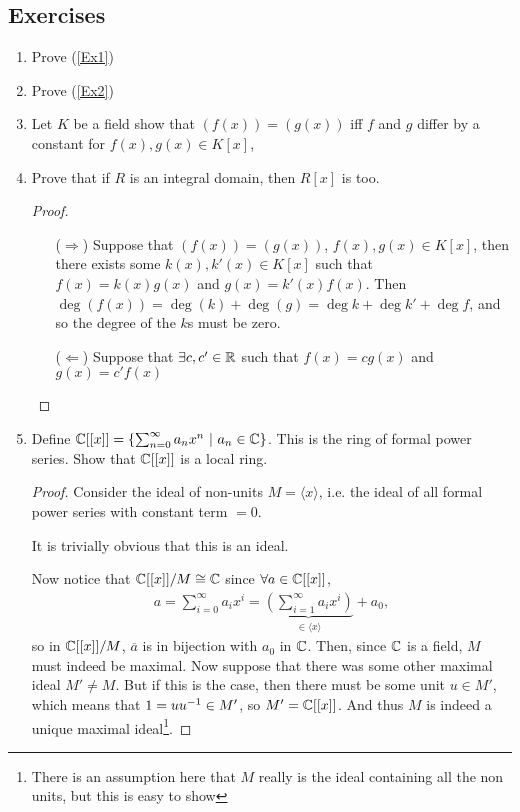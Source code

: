 \documentclass[12pt, twosided]{article}
\begin{document}
\subsection{Exercises}
\begin{enumerate}
\item Prove (\ref{Ex1})
\item Prove (\ref{Ex2})
\item Let \(K\) be a field show that \((f(x)) = (g(x))\) iff \(f\) and \(g\) differ by a constant for \(f(x), g(x) \in K[x]\), 
\item Prove that if \(R\) is an integral domain, then \(R[x]\) is too.
  \begin{proof}
    \begin{enumerate}
    \item [(\(\Rightarrow\))]Suppose that \((f(x)) = (g(x))\), \(f(x), g(x) \in K[x]\), then there exists some \(k(x), k\prime(x) \in K[x]\) such that \(f(x) = k(x)g(x)\) and \(g(x) = k\prime(x)f(x)\). Then \(\deg(f(x)) = \deg(k) + \deg(g) = \deg k + \deg k\prime + \deg f\), and so the degree of the \(k\)s must be zero.
    \item [(\(\Leftarrow\))] Suppose that \(\exists c, c\prime \in \R\) such that \(f(x) = cg(x)\) and \(g(x) = c\prime f(x)\)
    \end{enumerate}
  \end{proof}
\item Define \(\mathbb{C}[[x]] = \left\{ \sum_{n=0}^\infty a_nx^n \ \middle\vert\  a_n \in \mathbb{C}\right\}\). This is the ring of formal power series. Show that \(\mathbb{C}[[x]]\) is a local ring.

  \begin{proof}
    Consider the ideal of non-units \(M = \langle x \rangle\), i.e. the ideal of all formal power series with constant term \(= 0\).

    It is trivially obvious that this is an ideal.

    Now notice that \(\mathbb{C}[[x]]/M \cong \mathbb{C}\) since \(\forall a \in \mathbb{C}[[x]]\),
    \begin{align*}
      a = \sum_{i=0}^\infty a_ix^i = \underbrace{\left(\sum_{i = 1}^\infty a_ix^i\right)}_{\in \langle x \rangle} + a_0,
    \end{align*}
    so in \(\mathbb{C}[[x]]/M\), \(\overline{a}\) is in bijection with \(a_0\) in \(\mathbb{C}\). Then, since \(\mathbb{C}\) is a field, \(M\) must indeed be maximal. Now suppose that there was some other maximal ideal \(M\prime \neq M\). But if this is the case, then there must be some unit \(u \in M\prime\), which means that \(1 = uu\1 \in M\prime\), so \(M\prime = \C[[x]]\). And thus \(M\) is indeed a unique maximal ideal\footnote{There is an assumption here that \(M\) really is the ideal containing all the non units, but this is easy to show}.
  \end{proof}
\end{enumerate}
\end{document}
